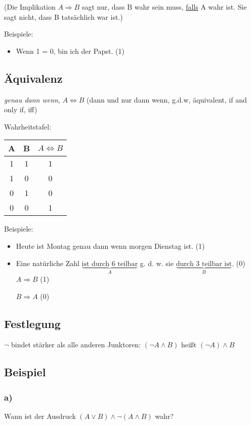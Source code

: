 \documentclass[a4paper, 12pt, twoside] {article}
\begin{document}

(Die Implikation $A \Rightarrow B$ sagt nur, dass B wahr sein muss, \underline{falls} A wahr ist. Sie sagt nicht, dass B tatsächlich war ist.)

Beispiele:
\begin{itemize}
\item Wenn 1 = 0, bin ich der Papst. (1)
\end{itemize}

\subsection{Äquivalenz}
\textit{genau dann wenn}, $ A \Leftrightarrow B$ (dann und nur dann wenn, g.d.w, äquivalent, if and only if, iff)

Wahrheitstafel: \qquad
\begin{tabular}{| c c | c |}
\hline
A & B & $A \Leftrightarrow B$ \\
\hline
1 & 1 & 1 \\
1 & 0 & 0 \\
0 & 1 & 0 \\
0 & 0 & 1 \\
\hline
\end{tabular}

Beispiele:
\begin{itemize}
\item Heute ist Montag genau dann wenn morgen Dienstag ist. (1)
\item Eine natürliche Zahl $\underbrace{\text{ist durch 6 teilbar}}_{A}$ g. d. w. sie $\underbrace{\text{durch 3 teilbar ist}}_{B}$. (0) 
$A \Rightarrow B$ (1) 

$B \Rightarrow A$ (0)
\end{itemize}


\subsection*{Festlegung}
$\neg$ bindet stärker als alle anderen Junktoren: $(\neg A \wedge B)$ heißt $ (\neg A) \wedge B$

\subsection{Beispiel}
\subsubsection*{a)}
Wann ist der Ausdruck $(A \lor B) \wedge \neg (A \wedge B)$ wahr?
\end{document}
